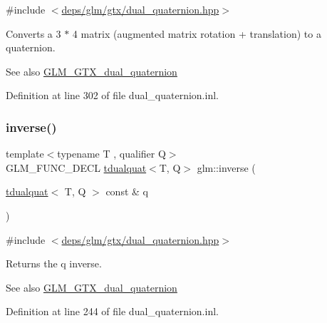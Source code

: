 {\ttfamily \#include $<$\hyperlink{dual__quaternion_8hpp}{deps/glm/gtx/dual\+\_\+quaternion.\+hpp}$>$}

Converts a 3 $\ast$ 4 matrix (augmented matrix rotation + translation) to a quaternion.

\begin{DoxySeeAlso}{See also}
\hyperlink{group__gtx__dual__quaternion}{G\+L\+M\+\_\+\+G\+T\+X\+\_\+dual\+\_\+quaternion} 
\end{DoxySeeAlso}


Definition at line 302 of file dual\+\_\+quaternion.\+inl.

\mbox{\label{group__gtx__dual__quaternion_ga070f521a953f6461af4ab4cf8ccbf27e}} 
\subsubsection{\texorpdfstring{inverse()}{inverse()}}
{\footnotesize\ttfamily template$<$typename T , qualifier Q$>$ \\
G\+L\+M\+\_\+\+F\+U\+N\+C\+\_\+\+D\+E\+CL \hyperlink{structglm_1_1tdualquat}{tdualquat}$<$T, Q$>$ glm\+::inverse (\begin{DoxyParamCaption}\item[{\hyperlink{structglm_1_1tdualquat}{tdualquat}$<$ T, Q $>$ const \&}]{q }\end{DoxyParamCaption})}



{\ttfamily \#include $<$\hyperlink{dual__quaternion_8hpp}{deps/glm/gtx/dual\+\_\+quaternion.\+hpp}$>$}

Returns the q inverse.

\begin{DoxySeeAlso}{See also}
\hyperlink{group__gtx__dual__quaternion}{G\+L\+M\+\_\+\+G\+T\+X\+\_\+dual\+\_\+quaternion} 
\end{DoxySeeAlso}


Definition at line 244 of file dual\+\_\+quaternion.\+inl.

\mbox{\label{group__gtx__dual__quaternion_gace8380112d16d33f520839cb35a4d173}} 
